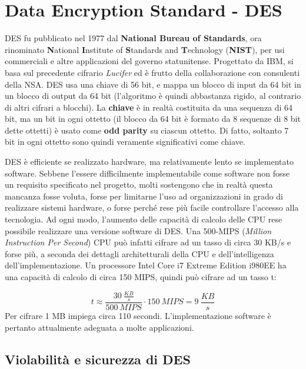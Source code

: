 \section{Data Encryption Standard - DES}
DES fu pubblicato nel 1977 dal \textbf{National Bureau of Standards}, ora rinominato \textbf{N}ational \textbf{I}nstitute of \textbf{S}tandards and \textbf{T}echnology (\textbf{NIST}), per usi commerciali e altre applicazioni del governo statunitense. Progettato da IBM, si basa sul precedente cifrario \textit{Lucifer} ed è frutto della collaborazione con consulenti della NSA. DES usa una chiave di 56 bit, e mappa un blocco di input da 64 bit in un blocco di output da 64 bit (l'algoritmo è quindi abbastanza rigido, al contrario di altri cifrari a blocchi). La \textbf{chiave} è in realtà costituita da una sequenza di 64 bit, ma un bit in ogni ottetto (il blocco da 64 bit è formato da 8 sequenze di 8 bit dette ottetti) è usato come \textbf{odd parity} su ciascun ottetto. Di fatto, soltanto 7 bit in ogni ottetto sono quindi veramente significativi come chiave. \newline \newline

DES è efficiente se realizzato hardware, ma relativamente lento se implementato software. Sebbene l'essere difficilmente implementabile come software non fosse un requisito specificato nel progetto, molti sostengono che in realtà questa mancanza fosse voluta, forse per limitarne l'uso ad organizzazioni in grado di realizzare sistemi hardware, o forse perché rese più facile controllare l'accesso alla tecnologia. Ad ogni modo, l'aumento delle capacità di calcolo delle CPU rese possibile realizzare una versione software di DES. Una 500-MIPS (\textit{Million Instruction Per Second}) CPU può infatti cifrare ad un tasso di circa 30 KB/s e forse più, a seconda dei dettagli architetturali della CPU e dell'intelligenza dell'implementazione. Un processore Intel Core i7 Extreme Edition i980EE ha una capacità di calcolo di circa 150 MIPS, quindi può cifrare ad un tasso t:

\begin{equation}
t \approx \frac{30 \: \frac{KB}{s}}{500 \: MIPS} \cdot 150 \: MIPS = 9 \: \frac{KB}{s}
\end{equation}  
Per cifrare 1 MB impiega circa 110 secondi. L’implementazione software è pertanto attualmente adeguata a molte applicazioni.\newline \newline


\subsection{Violabilità e sicurezza di DES}


